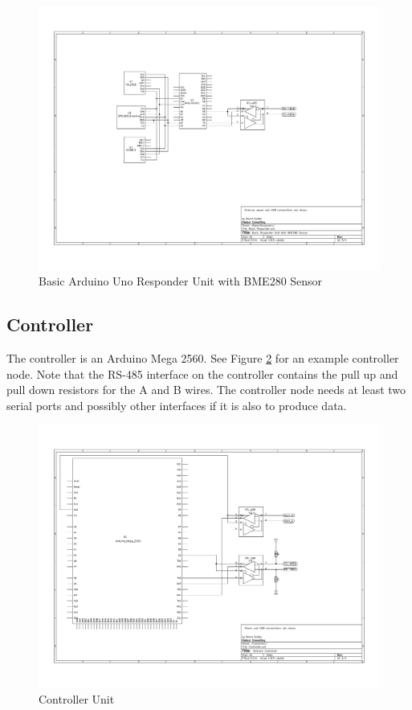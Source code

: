 \documentclass[10pt]{article}
\begin{document}
\begin{figure}
  \centering
  \includegraphics[width=\textwidth]{ResponderUnit.pdf}
  \caption{Basic Arduino Uno Responder Unit with BME280 Sensor}
  \label{fig:basic}
\end{figure}

\subsection{Controller}
The controller is an Arduino Mega 2560.  See Figure \ref{fig:controller} for an example controller node.  Note that the RS-485 interface on the controller contains the pull up and pull down resistors for the A and B wires.  The controller node needs at least two serial ports and possibly other interfaces if it is also to produce data.

\begin{figure}
  \centering
  \includegraphics[width=\textwidth]{ControllerUnit.pdf}
  \caption{Controller Unit}
  \label{fig:controller}
\end{figure}
\end{document}

